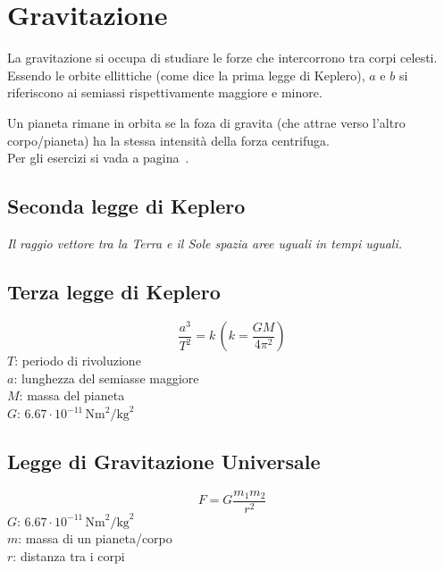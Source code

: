 
\section{Gravitazione}\label{sec:gravitazione}
La gravitazione si occupa di studiare le forze che intercorrono tra corpi celesti.\\ 
Essendo le orbite ellittiche (come dice la prima legge di Keplero), $a$ e $b$ si riferiscono ai 
semiassi rispettivamente maggiore e minore.
\begin{center}
\end{center}
Un pianeta rimane in orbita se la foza di gravita (che attrae verso l'altro corpo/pianeta) ha la 
stessa intensità della forza centrifuga.\\
Per gli esercizi si vada a pagina~\pageref{ex:gravitazione}.

\subsection{Seconda legge di Keplero}
\textit{Il raggio vettore tra la Terra e il Sole spazia aree uguali in tempi uguali.}

\subsection{Terza legge di Keplero}
\begin{equation*}
\frac{a^3}{T^2} = k\,\left(k = \frac{GM}{4\pi^2}\right)
\end{equation*}
$T$: periodo di rivoluzione\\
$a$: lunghezza del semiasse maggiore\\
$M$: massa del pianeta\\
\hyperref[tab:G]{$G$}: $6.67\cdot10^{-11}\,\text{Nm}^2\text{/kg}^2$

\subsection{Legge di Gravitazione Universale}
\begin{equation*}
F = G\frac{m_1m_2}{r^2}
\end{equation*}
\hyperref[tab:g]{$G$}: $6.67\cdot10^{-11}\,\text{Nm}^2\text{/kg}^2$\\
$m$: massa di un pianeta/corpo\\
$r$: distanza tra i corpi

